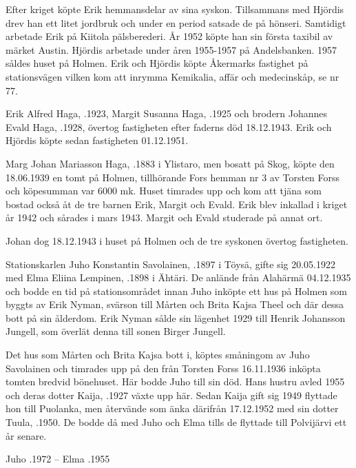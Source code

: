 Efter kriget köpte Erik hemmansdelar av sina syskon. Tillsammans med Hjördis drev han ett litet jordbruk och under en period satsade de på  hönseri. Samtidigt arbetade Erik på Kiitola pälsberederi. År 1952 köpte han sin första taxibil av märket Austin. Hjördis arbetade under åren 1955-1957 på Andelsbanken. 1957 såldes huset på Holmen. Erik och Hjördis köpte Åkermarks fastighet på stationsvägen vilken kom att inrymma Kemikalia, affär och medecinskåp, se nr 77.
\begin{jhchildren}
  \item {}
  \item {}
  \item {}
  \item {}
\end{jhchildren}


Erik Alfred Haga, .1923,  Margit Susanna Haga, .1925 och brodern Johannes Evald Haga, .1928, övertog fastigheten efter faderns död 18.12.1943. Erik och Hjördis köpte sedan fastigheten 01.12.1951.


Marg
Johan Mariasson Haga, .1883 i Ylistaro, men bosatt på Skog, köpte den 18.06.1939 en tomt på Holmen, tillhörande Fors hemman nr 3 av Torsten Forss och köpesumman var 6000 mk. Huset timrades upp och kom att tjäna som bostad också åt de tre barnen Erik, Margit och Evald. Erik blev inkallad i kriget år 1942 och sårades i mars 1943. Margit och Evald studerade på annat ort.

Johan dog 18.12.1943 i huset på Holmen och de tre syskonen övertog fastigheten.




Stationskarlen Juho Konstantin Savolainen, .1897 i Töysä, gifte sig 20.05.1922 med Elma Eliina Lempinen, .1898 i Ähtäri. De anlände från Alahärmä 04.12.1935 och bodde en tid på stationsområdet innan Juho inköpte ett hus på Holmen som byggts av Erik Nyman, svärson till Mårten och Brita Kajsa Theel och där dessa bott på sin ålderdom. Erik Nyman sålde sin lägenhet 1929 till Henrik Johansson Jungell, som överlät denna till sonen Birger Jungell.

Det hus som Mårten och Brita Kajsa bott i, köptes småningom av Juho Savolainen och timrades upp på den från Torsten Forss 16.11.1936 inköpta tomten bredvid bönehuset. Här bodde Juho till sin död. Hans hustru avled 1955 och deras dotter Kaija, .1927 växte upp här. Sedan Kaija gift sig 1949 flyttade hon till Puolanka, men återvände som änka därifrån 17.12.1952 med sin dotter Tuula, .1950. De bodde då med Juho och Elma tills de flyttade till Polvijärvi ett år senare.

Juho .1972  --  Elma .1955



